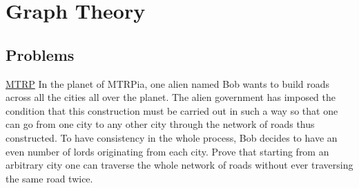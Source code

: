 \section{Graph Theory}
\subsection{Problems}
\begin{problem}{1}{\href{https://artofproblemsolving.com/community/c6h3281174p34327473}{MTRP}}
	In the planet of MTRPia, one alien named Bob wants to build roads across all the cities all over the planet. The alien government has imposed the condition that this construction must be carried out in such a way so that one can go from one city to any other city through the network of roads thus constructed. To have consistency in the whole process, Bob decides to have an even number of lords originating from each city. Prove that starting from an arbitrary city one can traverse the whole network of roads without ever traversing the same road twice.
\end{problem}


